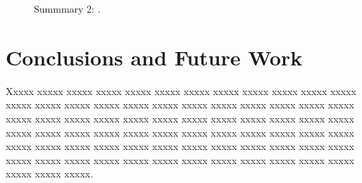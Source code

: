 \documentclass[conference]{IEEEtran}
\begin{document}
\begin{figure}%
%
\caption{Summmary 2: .}
\label{fig:results_and_discussion:summarisation_models:summary2}
\end{figure}


\section{Conclusions and Future Work}
\label{sec:conclusion}
Xxxxx xxxxx xxxxx  xxxxx  xxxxx  xxxxx  xxxxx  xxxxx  xxxxx  xxxxx  xxxxx  xxxxx  xxxxx  xxxxx  xxxxx  xxxxx  xxxxx  xxxxx  xxxxx  xxxxx  xxxxx  xxxxx  xxxxx  xxxxx  xxxxx  xxxxx  xxxxx  xxxxx  xxxxx  xxxxx  xxxxx  xxxxx  xxxxx  xxxxx  xxxxx  xxxxx  xxxxx  xxxxx  xxxxx  xxxxx  xxxxx  xxxxx  xxxxx  xxxxx  xxxxx  xxxxx  xxxxx  xxxxx  xxxxx  xxxxx  xxxxx  xxxxx  xxxxx  xxxxx  xxxxx  xxxxx  xxxxx  xxxxx  xxxxx  xxxxx  xxxxx  xxxxx  xxxxx  xxxxx  xxxxx  xxxxx  xxxxx  xxxxx  xxxxx  xxxxx  xxxxx  xxxxx  xxxxx  xxxxx  xxxxx.





\end{document}
